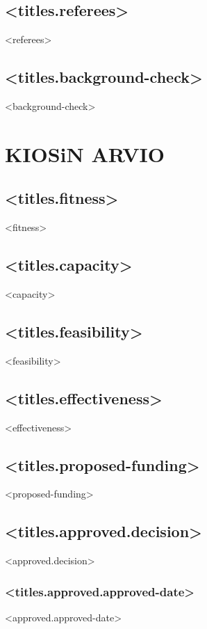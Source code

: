 \documentclass[twoside,a4paper]{article}
\begin{document}
		\subsection*{<titles.referees>}
		    <referees>
		
		\subsection*{<titles.background-check>}
		    <background-check>
		
	\newpage	
	\section{KIOSiN ARVIO}
		\subsection*{<titles.fitness>}
		    <fitness>
		
		\subsection*{<titles.capacity>}
		    <capacity>
		
		\subsection*{<titles.feasibility>}		
		    <feasibility>
		
		\subsection*{<titles.effectiveness>}	
		    <effectiveness>
		
		\subsection*{<titles.proposed-funding>}
		    <proposed-funding>
		
	    \subsection*{<titles.approved.decision>}		
		<approved.decision>
		
		\subsubsection*{<titles.approved.approved-date>}
		<approved.approved-date>
	
\end{document}
